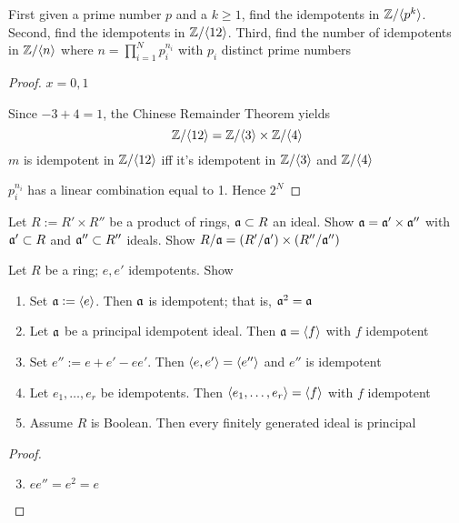 \documentclass[11pt]{article}
\begin{document}
\begin{exercise}
\label{ex1.22}
First given a prime number \(p\) and a \(k\ge1\), find the idempotents in
\(\mathbb{Z}/\langle p^k\rangle\). Second, find the idempotents in \(\mathbb{Z}/\langle12\rangle\). Third,
find the number of idempotents in \(\mathbb{Z}/\langle n\rangle\) where
\(n=\prod_{i=1}^Np_i^{n_i}\) with \(p_i\) distinct prime numbers
\end{exercise}

\begin{proof}
\(x=0,1\)

Since \(-3+4=1\), the Chinese Remainder Theorem yields
\begin{equation*}
\mathbb{Z}/\langle 12\rangle=\mathbb{Z}/\langle3\rangle\times\mathbb{Z}/\langle4\rangle
\end{equation*}
\(m\) is idempotent in \(\mathbb{Z}/\langle12\rangle\) iff it's idempotent in \(\mathbb{Z}/\langle3\rangle\)
and \(\mathbb{Z}/\langle4\rangle\)

\(p_i^{n_i}\) has a linear combination equal to 1. Hence \(2^N\)
\end{proof}

\begin{exercise}
\label{ex1.23}
Let \(R:=R'\times R''\) be a product of rings, \(\mathfrak{a}\subset R\) an ideal.
Show \(\mathfrak{a}=\mathfrak{a}'\times\mathfrak{a}''\) with \(\mathfrak{a}'\subset R\) and \(\mathfrak{a}''\subset R''\)
ideals. Show \(R/\mathfrak{a}=(R'/\mathfrak{a}')\times(R''/\mathfrak{a}'')\)
\end{exercise}

\begin{exercise}
\label{ex1.24}
Let \(R\) be a ring; \(e,e'\) idempotents. Show
\begin{enumerate}
\item Set \(\mathfrak{a}:=\langle e\rangle\). Then \(\mathfrak{a}\) is idempotent; that is, \(\mathfrak{a}^2=\mathfrak{a}\)
\item Let \(\mathfrak{a}\) be a principal idempotent ideal. Then \(\mathfrak{a}=\langle f\rangle\) with
\(f\) idempotent
\item Set \(e'':=e+e'-ee'\). Then \(\langle e,e'\rangle=\langle e''\rangle\) and \(e''\) is
idempotent
\item Let \(e_1,\dots,e_r\) be idempotents. Then \(\langle e_1,\dots,e_r\rangle=\langle
      f\rangle\) with \(f\) idempotent
\item Assume \(R\) is Boolean. Then every finitely generated ideal is principal
\end{enumerate}
\end{exercise}

\begin{proof}
\begin{enumerate}
\setcounter{enumi}{2}
\item \(ee''=e^2=e\)
\end{enumerate}
\end{proof}
\end{document}
